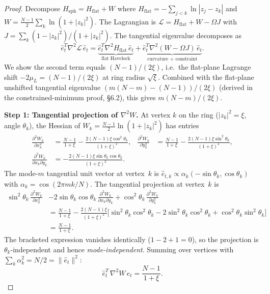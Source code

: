 \documentclass[11pt]{article}
\theoremstyle{remark}
\begin{document}
\begin{proof}
Decompose $H_{\mathrm{sph}} = H_{\mathrm{flat}} + W$ where
$H_{\mathrm{flat}} = -\sum_{j<k}\ln|z_j - z_k|$ and
$W = \tfrac{N-1}{2}\sum_k \ln(1+|z_k|^2)$.  The Lagrangian is
$\mathcal{L} = H_{\mathrm{flat}} + W - \Omega J$ with
$J = \sum_k(1-|z_k|^2)/(1+|z_k|^2)$.  The tangential eigenvalue
decomposes as
\[
  \hat e_t^T \nabla^2\mathcal{L}\,\hat e_t
  = \underbrace{\hat e_t^T \nabla^2 H_{\mathrm{flat}}\,\hat e_t}_{
      \text{flat Havelock}}
  + \underbrace{\hat e_t^T \nabla^2(W - \Omega J)\,\hat e_t}_{
      \text{curvature + constraint}}.
\]
We show the second term equals $(N-1)/(2\xi)$, i.e.\ the flat-plane
Lagrange shift $-2\mu_L = (N-1)/(2\xi)$ at ring radius $\sqrt{\xi}$.
Combined with the flat-plane unshifted tangential eigenvalue
$(m(N-m) - (N-1))/(2\xi)$ (derived in the constrained-minimum proof,
\S6.2), this gives $m(N-m)/(2\xi)$.

\medskip
\textbf{Step 1: Tangential projection of $\nabla^2 W$.}
At vertex $k$ on the ring ($|z_k|^2 = \xi$, angle $\theta_k$), the
Hessian of $W_k = \tfrac{N-1}{2}\ln(1+|z_k|^2)$ has entries
\begin{align*}
  \frac{\partial^2 W_k}{\partial x_k^2}
    &= \frac{N-1}{1+\xi} - \frac{2(N-1)\xi\cos^2\!\theta_k}{(1+\xi)^2},
  &
  \frac{\partial^2 W_k}{\partial y_k^2}
    &= \frac{N-1}{1+\xi} - \frac{2(N-1)\xi\sin^2\!\theta_k}{(1+\xi)^2},
  \\
  \frac{\partial^2 W_k}{\partial x_k\partial y_k}
    &= -\frac{2(N-1)\xi\sin\theta_k\cos\theta_k}{(1+\xi)^2}.
\end{align*}
The mode-$m$ tangential unit vector at vertex~$k$ is
$\hat e_{t,k} \propto \alpha_k(-\sin\theta_k, \cos\theta_k)$
with $\alpha_k = \cos(2\pi mk/N)$.  The tangential projection
at vertex~$k$ is
\begin{align*}
  \sin^2\!\theta_k\,\frac{\partial^2 W_k}{\partial x_k^2}
  &- 2\sin\theta_k\cos\theta_k\,\frac{\partial^2 W_k}{\partial x_k\partial y_k}
  + \cos^2\!\theta_k\,\frac{\partial^2 W_k}{\partial y_k^2} \\
  &= \frac{N-1}{1+\xi}
    - \frac{2(N-1)\xi}{(1+\xi)^2}
      \bigl[\sin^2\!\theta_k\cos^2\!\theta_k
            - 2\sin^2\!\theta_k\cos^2\!\theta_k
            + \cos^2\!\theta_k\sin^2\!\theta_k\bigr] \\
  &= \frac{N-1}{1+\xi}.
\end{align*}
The bracketed expression vanishes identically ($1 - 2 + 1 = 0$), so
the projection is $\theta_k$-independent and hence \emph{mode-independent}.
Summing over vertices with $\sum_k \alpha_k^2 = N/2 = \|\hat e_t\|^2$:
\begin{equation}\label{eq:W-tt}
  \hat e_t^T\,\nabla^2 W\,\hat e_t = \frac{N-1}{1+\xi}.
\end{equation}


\end{proof}
\end{document}
